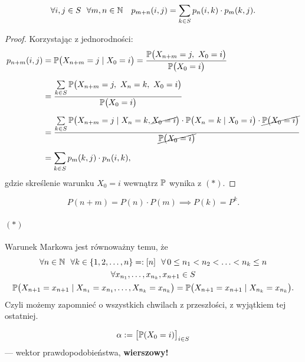 \documentclass[dvipsnames]{book}
\begin{document}
\begin{stwierdzenie}
\[
  \forall i,j \in S\ \ \forall m,n \in \N\quad
  p_{m+n}(i,j) = \sum_{k \in S} p_n(i,k) \cdot p_m(k,j).
\]
\end{stwierdzenie}

\begin{proof}
Korzystając z jednorodności:
\begin{align*}
  p_{n+m}(i,j)
  &= \P\big(X_{n+m} = j \mid X_0 = i\big)
   = \frac{\P\big(X_{n+m} = j,\ X_0 = i\big)}{\P\big(X_0 = i\big)} \\[2mm]
  &= \frac{\sum\limits_{k \in S} \P\big(X_{n+m} = j,\ X_n = k,\ X_0 = i\big)}
          {\P\big(X_0 = i\big)} \\[2mm]
  &= \frac{\sum\limits_{k \in S}
      \P\big(X_{n+m} = j \mid X_n = k, \cancel{X_0 = i}\big) \cdot
      \P\big(X_n = k \mid X_0 = i\big) \cdot \cancel{\P\big(X_0 = i\big)}}
          {\cancel{\P\big(X_0 = i\big)}} \\[2mm]
  &= \sum_{k \in S} p_m(k,j) \cdot p_n(i,k),
\end{align*}
gdzie skreślenie warunku $X_0 = i$ wewnątrz $\P$ wynika z $(*)$.
\end{proof}

\begin{wniosek}
\[
  P(n+m) = P(n) \cdot P(m) \implies P(k) = P^k.
\]
\end{wniosek}

\paragraph{$(*)$} Warunek Markowa jest równoważny temu, że
\begin{gather*}
  \forall n \in \N\ \ \forall k \in \{1,2,\ldots,n\} =: [n]\ \
  \forall\, 0 \leq n_1 < n_2 < \ldots < n_k \leq n \\
  \forall x_{n_1}, \ldots, x_{n_k}, x_{n+1} \in S \\
  \P\big(X_{n+1} = x_{n+1} \mid X_{n_1} = x_{n_1}, \ldots, X_{n_k} = x_{n_k}\big)
  = \P\big(X_{n+1} = x_{n+1} \mid X_{n_k} = x_{n_k}\big).
\end{gather*}
Czyli możemy zapomnieć o wszystkich chwilach z przeszłości, z wyjątkiem tej
ostatniej.

\begin{definicja}
\[
  \alpha := \big[\P(X_0 = i)\big]_{i \in S}
\]
--- wektor prawdopodobieństwa, \textbf{wierszowy!}
\end{definicja}
\end{document}
